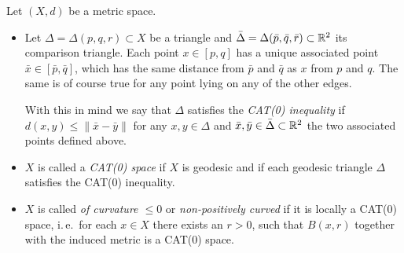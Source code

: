 \begin{defin}
  Let \((X,d)\) be a metric space.\vspace{-6pt}
  \label{def:cat}
  \begin{itemize}
  \item Let \(\Delta = \Delta(p,q,r) \subset X\) be a triangle and \(\bar \Delta = \Delta(\bar p, \bar q, \bar r) \subset \mathbb{R}^2\) its comparison triangle. Each point \(x \in [p,q]\) has a unique associated point \(\bar x \in [\bar p, \bar q]\), which has the same distance from \(\bar p\) and \(\bar q\) as \(x\) from \(p\) and \(q\). The same is of course true for any point lying on any of the other edges.

    With this in mind we say that \(\Delta\) satisfies the \emph{CAT(0) inequality} if \(d(x,y) \leq \|\bar x- \bar y\|\) for any \(x, y \in \Delta\) and \(\bar x, \bar y \in \bar \Delta \subset \mathbb{R}^2\) the two associated points defined above.
  \item \(X\) is called a \emph{CAT(0) space} if \(X\) is geodesic and if each geodesic triangle \(\Delta\) satisfies the CAT(0) inequality.
  \item \(X\) is called \emph{of curvature \(\leq 0\)} or \emph{non-positively curved} if it is locally a CAT(\(0\)) space, i.\,e.\ for each \(x \in X\) there exists an \(r > 0\), such that \(B(x,r)\) together with the induced metric is a CAT(\(0\)) space.
  \end{itemize}
\end{defin}

